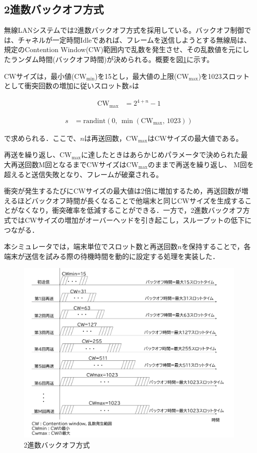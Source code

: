 \documentclass[a4paper,10pt]{ltjsarticle}
\begin{document}
\subsection{2進数バックオフ方式}

無線LANシステムでは2進数バックオフ方式を採用している。バックオフ制御では、チャネルが一定時間Idleであれば、フレームを送信しようとする無線局は、規定のContention Window(CW)範囲内で乱数を発生させ、その乱数値を元にしたランダム時間(バックオフ時間)が決められる。概要を図\ref{binary-backoff}に示す。


CWサイズは，最小値($\mathrm{CW_{min}}$)を15とし，最大値の上限($\mathrm{CW_{max}}$)を1023スロットとして衝突回数の増加に従いスロット数$s$は


\begin{align}
  \mathrm{CW}_{\max} &= 2^{4 + n} - 1
\end{align}

\begin{align}
  s &= \mathrm{randint}(0, \, \min(\mathrm{CW}_{\max}, \, 1023))
  \label{slot}
\end{align}

で求められる．ここで、$n$は再送回数，$\mathrm{CW}_{\max}$はCWサイズの最大値である。

再送を繰り返し、$\mathrm{CW_{max}}$に達したときはあらかじめパラメータで決められた最大再送回数M回となるまでCWサイズは$\mathrm{CW_{max}}$のままで再送を繰り返し、
M回を超えると送信失敗となり、フレームが破棄される。

衝突が発生するたびにCWサイズの最大値は2倍に増加するため，再送回数が増えるほどバックオフ時間が長くなることで他端末と同じCWサイズを生成することがなくなり，衝突確率を低減することができる．一方で，2進数バックオフ方式ではCWサイズの増加がオーバーヘッドを引き起こし，スループットの低下につながる．


本シミュレータでは，端末単位でスロット数と再送回数$n$を保持することで，各端末が送信を試みる際の待機時間を動的に設定する処理を実装した．

\begin{figure}[H]
  \centering
  \includegraphics[width=\textwidth]{./assets/CW_.png}
  \caption{2進数バックオフ方式}
  \label{binary-backoff}
\end{figure}
\end{document}
